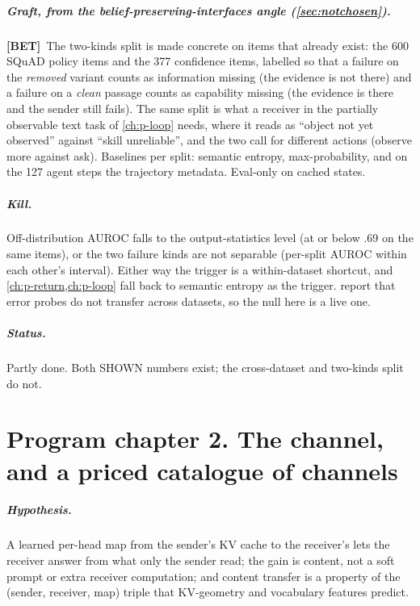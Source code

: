 \documentclass[11pt,a4paper]{report}
\newcommand{\BET}{\textcolor{betc}{\textbf{\scriptsize[BET]}}}
\newcommand{\mbet}{\marginnote{\BET}}
\begin{document}
\paragraph{Graft, from the belief-preserving-interfaces angle (\cref{sec:notchosen}).} \BET\ The two-kinds split is made concrete on items that already exist: the 600 SQuAD policy items and the 377 confidence items, labelled so that a failure on the \emph{removed} variant counts as information missing (the evidence is not there) and a failure on a \emph{clean} passage counts as capability missing (the evidence is there and the sender still fails). The same split is what a receiver in the partially observable text task of \cref{ch:p-loop} needs, where it reads as ``object not yet observed'' against ``skill unreliable'', and the two call for different actions (observe more against ask). Baselines per split: semantic entropy, max-probability, and on the 127 agent steps the trajectory metadata. Eval-only on cached states.

\paragraph{Kill.} Off-distribution AUROC falls to the output-statistics level (at or below .69 on the same items), or the two failure kinds are not separable (per-split AUROC within each other's interval). Either way the trigger is a within-dataset shortcut, and \cref{ch:p-return,ch:p-loop} fall back to semantic entropy as the trigger. \citet{orgad2025know} report that error probes do not transfer across datasets, so the null here is a live one.

\paragraph{Status.} Partly done. Both SHOWN numbers exist; the cross-dataset and two-kinds split do not.

\chapter{Program chapter 2. The channel, and a priced catalogue of channels}
\label{ch:p-channel}

\paragraph{Hypothesis.} \mbet A learned per-head map from the sender's KV cache to the receiver's lets the receiver answer from what only the sender read; the gain is content, not a soft prompt or extra receiver computation; and content transfer is a property of the (sender, receiver, map) triple that KV-geometry and vocabulary features predict.
\end{document}
